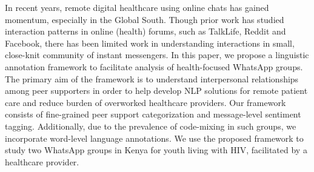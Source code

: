 In recent years, remote digital healthcare using online chats has gained momentum, especially in the Global South. Though prior work has studied interaction patterns in online (health) forums, such as TalkLife, Reddit and Facebook, there has been limited work in understanding interactions in small, close-knit community of instant messengers. In this paper, we propose a linguistic annotation framework to facilitate analysis of health-focused WhatsApp groups. The primary aim of the framework is to understand interpersonal relationships among peer supporters in order to help develop NLP solutions for remote patient care and reduce burden of overworked healthcare providers. Our framework consists of fine-grained peer support categorization and message-level sentiment tagging. Additionally, due to the prevalence of code-mixing in such groups, we incorporate word-level language annotations. We use the proposed framework to study two WhatsApp groups in Kenya for  youth living with HIV, facilitated by a healthcare provider.
